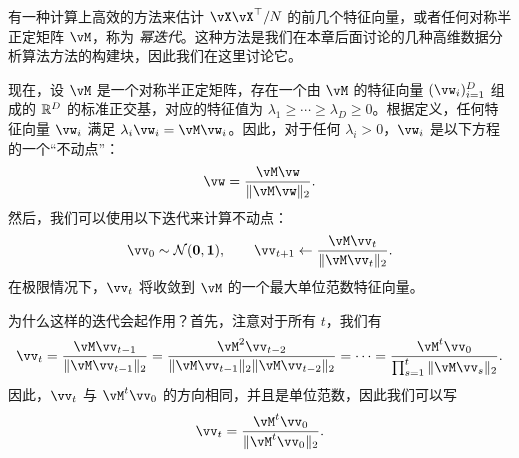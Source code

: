 \documentclass[../../book-main_zh.tex]{subfiles}
\begin{document}
有一种计算上高效的方法来估计 \(\vX\vX^{\top}/N\) 的前几个特征向量，或者任何对称半正定矩阵 \(\vM\)，称为 \textit{幂迭代}。这种方法是我们在本章后面讨论的几种高维数据分析算法方法的构建块，因此我们在这里讨论它。

现在，设 \(\vM\) 是一个对称半正定矩阵，存在一个由 \(\vM\) 的特征向量 \((\vw_{i})_{i = 1}^{D}\) 组成的 \(\mathbb{R}^{D}\) 的标准正交基，对应的特征值为 \(\lambda_{1} \geq \cdots \geq \lambda_{D} \geq 0\)。根据定义，任何特征向量 \(\vw_i\) 满足 \(\lambda_i \vw_i = \vM \vw_i\)。因此，对于任何 \(\lambda_i > 0\)，\(\vw_i\) 是以下方程的一个“不动点”：
\begin{equation}
    \vw = \frac{\vM\vw}{\norm{\vM\vw}_{2}}.
    \label{eqn:PCA-fixed-point}
\end{equation}
然后，我们可以使用以下迭代来计算不动点：
\begin{equation}\label{eq:power_iteration}
    \vv_{0} \sim \dNorm(\vzero, \vone), \qquad \vv_{t + 1} \gets \frac{\vM\vv_{t}}{\norm{\vM\vv_{t}}_{2}}.
\end{equation}
在极限情况下，\(\vv_{t}\) 将收敛到 \(\vM\) 的一个最大单位范数特征向量。

为什么这样的迭代会起作用？首先，注意对于所有 \(t\)，我们有
\begin{equation}
    \vv_{t} = \frac{\vM\vv_{t - 1}}{\norm{\vM\vv_{t - 1}}_{2}} = \frac{\vM^{2}\vv_{t - 2}}{\norm{\vM\vv_{t - 1}}_{2}\norm{\vM\vv_{t - 2}}_{2}} = \cdots = \frac{\vM^{t}\vv_{0}}{\prod_{s = 1}^{t}\norm{\vM\vv_{s}}_{2}}.
\end{equation}
因此，\(\vv_{t}\) 与 \(\vM^{t}\vv_{0}\) 的方向相同，并且是单位范数，因此我们可以写
\begin{equation}
    \vv_{t} = \frac{\vM^{t}\vv_{0}}{\norm{\vM^{t}\vv_{0}}_{2}}.
\end{equation}
\end{document}
